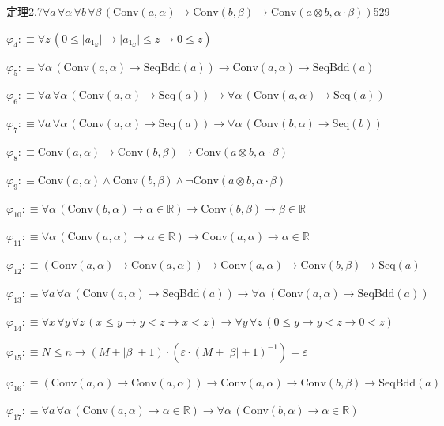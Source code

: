 \begin{fullproof}{定理2.7}{$\forall a\,\forall \alpha\,\forall b\,\forall \beta\,(\mathrm{Conv}(a,\alpha) \to \mathrm{Conv}(b,\beta) \to \mathrm{Conv}(a \otimes b,\alpha \cdot \beta))$}{529}
\begin{abbrevlist}
\item $\varphi_{4} :\equiv \forall z\,(0 \leq \lvert a_{1_{\omega}} \rvert \to \lvert a_{1_{\omega}} \rvert \leq z \to 0 \leq z)$
\item $\varphi_{5} :\equiv \forall \alpha\,(\mathrm{Conv}(a,\alpha) \to \mathrm{SeqBdd}(a)) \to \mathrm{Conv}(a,\alpha) \to \mathrm{SeqBdd}(a)$
\item $\varphi_{6} :\equiv \forall a\,\forall \alpha\,(\mathrm{Conv}(a,\alpha) \to \mathrm{Seq}(a)) \to \forall \alpha\,(\mathrm{Conv}(a,\alpha) \to \mathrm{Seq}(a))$
\item $\varphi_{7} :\equiv \forall a\,\forall \alpha\,(\mathrm{Conv}(a,\alpha) \to \mathrm{Seq}(a)) \to \forall \alpha\,(\mathrm{Conv}(b,\alpha) \to \mathrm{Seq}(b))$
\item $\varphi_{8} :\equiv \mathrm{Conv}(a,\alpha) \to \mathrm{Conv}(b,\beta) \to \mathrm{Conv}(a \otimes b,\alpha \cdot \beta)$
\item $\varphi_{9} :\equiv \mathrm{Conv}(a,\alpha) \land \mathrm{Conv}(b,\beta) \land \neg \mathrm{Conv}(a \otimes b,\alpha \cdot \beta)$
\item $\varphi_{10} :\equiv \forall \alpha\,(\mathrm{Conv}(b,\alpha) \to \alpha \in \mathbb{R}) \to \mathrm{Conv}(b,\beta) \to \beta \in \mathbb{R}$
\item $\varphi_{11} :\equiv \forall \alpha\,(\mathrm{Conv}(a,\alpha) \to \alpha \in \mathbb{R}) \to \mathrm{Conv}(a,\alpha) \to \alpha \in \mathbb{R}$
\item $\varphi_{12} :\equiv (\mathrm{Conv}(a,\alpha) \to \mathrm{Conv}(a,\alpha)) \to \mathrm{Conv}(a,\alpha) \to \mathrm{Conv}(b,\beta) \to \mathrm{Seq}(a)$
\item $\varphi_{13} :\equiv \forall a\,\forall \alpha\,(\mathrm{Conv}(a,\alpha) \to \mathrm{SeqBdd}(a)) \to \forall \alpha\,(\mathrm{Conv}(a,\alpha) \to \mathrm{SeqBdd}(a))$
\item $\varphi_{14} :\equiv \forall x\,\forall y\,\forall z\,(x \leq y \to y < z \to x < z) \to \forall y\,\forall z\,(0 \leq y \to y < z \to 0 < z)$
\item $\varphi_{15} :\equiv N \leq n \to (M + \lvert \beta \rvert + 1) \cdot (\varepsilon \cdot (M + \lvert \beta \rvert + 1)^{-1}) = \varepsilon$
\item $\varphi_{16} :\equiv (\mathrm{Conv}(a,\alpha) \to \mathrm{Conv}(a,\alpha)) \to \mathrm{Conv}(a,\alpha) \to \mathrm{Conv}(b,\beta) \to \mathrm{SeqBdd}(a)$
\item $\varphi_{17} :\equiv \forall a\,\forall \alpha\,(\mathrm{Conv}(a,\alpha) \to \alpha \in \mathbb{R}) \to \forall \alpha\,(\mathrm{Conv}(b,\alpha) \to \alpha \in \mathbb{R})$

\end{abbrevlist}
\end{fullproof}

